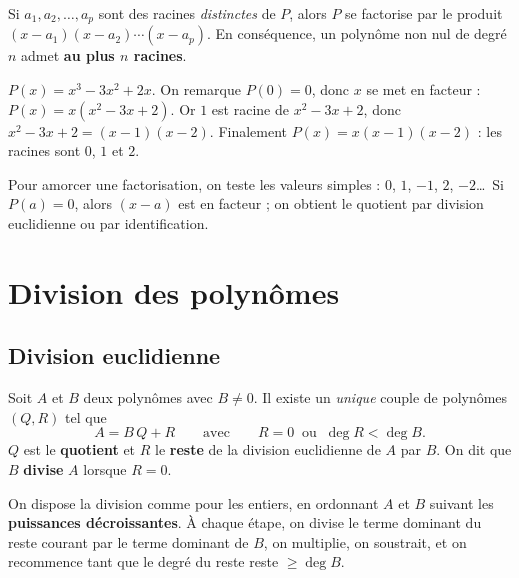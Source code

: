 \begin{propriete}
Si $a_1,a_2,\dots,a_p$ sont des racines \emph{distinctes} de $P$, alors $P$ se factorise
par le produit $(x-a_1)(x-a_2)\cdots(x-a_p)$. En conséquence, un polynôme non nul de
degré $n$ admet \textbf{au plus $n$ racines}.
\end{propriete}

\begin{exemple}
$P(x)=x^3-3x^2+2x$. On remarque $P(0)=0$, donc $x$ se met en facteur :
$P(x)=x(x^2-3x+2)$. Or $1$ est racine de $x^2-3x+2$, donc
$x^2-3x+2=(x-1)(x-2)$. Finalement $P(x)=x(x-1)(x-2)$ : les racines sont $0$, $1$ et $2$.
\end{exemple}

\begin{aretenir}
Pour amorcer une factorisation, on teste les valeurs simples : $0$, $1$, $-1$, $2$,
$-2$\dots\ Si $P(a)=0$, alors $(x-a)$ est en facteur ; on obtient le quotient par
division euclidienne ou par identification.
\end{aretenir}

\section{Division des polynômes}

\subsection{Division euclidienne}

\begin{theoreme}
Soit $A$ et $B$ deux polynômes avec $B\neq 0$. Il existe un \emph{unique} couple de
polynômes $(Q,R)$ tel que
\[ A = B\,Q + R \qquad\text{avec}\qquad R=0 \ \text{ ou } \ \deg R < \deg B. \]
$Q$ est le \textbf{quotient} et $R$ le \textbf{reste} de la division euclidienne de $A$
par $B$. On dit que $B$ \textbf{divise} $A$ lorsque $R=0$.
\end{theoreme}

\begin{aretenir}
On dispose la division comme pour les entiers, en ordonnant $A$ et $B$ suivant les
\textbf{puissances décroissantes}. À chaque étape, on divise le terme dominant du reste
courant par le terme dominant de $B$, on multiplie, on soustrait, et on recommence tant
que le degré du reste reste $\ge \deg B$.
\end{aretenir}

